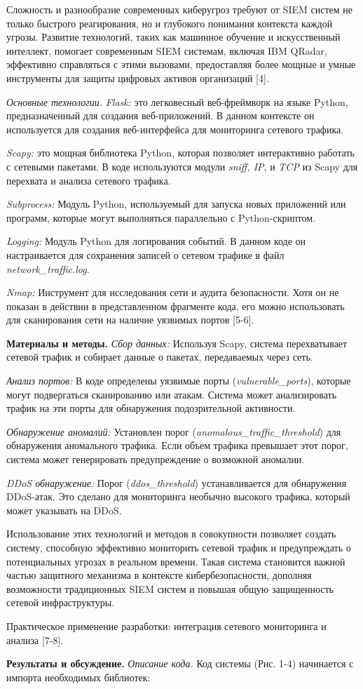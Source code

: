 \begin{multicols}{2}
Сложность и разнообразие современных киберугроз требуют от SIEM систем
не только быстрого реагирования, но и глубокого понимания контекста
каждой угрозы. Развитие технологий, таких как машинное обучение и
искусственный интеллект, помогает современным SIEM системам, включая IBM
QRadar, эффективно справляться с этими вызовами, предоставляя более
мощные и умные инструменты для защиты цифровых активов организаций
{[}4{]}.

\emph{Основные технологии.} \emph{Flask:} это легковесный веб-фреймворк
на языке Python, предназначенный для создания веб-приложений. В данном
контексте он используется для создания веб-интерфейса для мониторинга
сетевого трафика.

\emph{Scapy:} это мощная библиотека Python, которая позволяет
интерактивно работать с сетевыми пакетами. В коде используются модули
\emph{sniff, IP}, и \emph{TCP} из Scapy для перехвата и анализа сетевого
трафика.

\emph{Subprocess:} Модуль Python, используемый для запуска новых
приложений или программ, которые могут выполняться параллельно с
Python-скриптом.

\emph{Logging:} Модуль Python для логирования событий. В данном коде он
настраивается для сохранения записей о сетевом трафике в файл
\emph{network\_traffic.log}.

\emph{Nmap:} Инструмент для исследования сети и аудита безопасности.
Хотя он не показан в действии в представленном фрагменте кода, его можно
использовать для сканирования сети на наличие уязвимых портов {[}5-6{]}.

{\bfseries Материалы и методы.} \emph{Сбор данных:} Используя Scapy,
система перехватывает сетевой трафик и собирает данные о пакетах,
передаваемых через сеть.

\emph{Анализ портов:} В коде определены уязвимые порты
(\emph{vulnerable\_ports}), которые могут подвергаться сканированию или
атакам. Система может анализировать трафик на эти порты для обнаружения
подозрительной активности.

\emph{Обнаружение аномалий:} Установлен порог
(\emph{anomalous\_traffic\_threshold}) для обнаружения аномального
трафика. Если объем трафика превышает этот порог, система может
генерировать предупреждение о возможной аномалии.

\emph{DDoS обнаружение:} Порог (\emph{ddos\_threshold}) устанавливается
для обнаружения DDoS-атак. Это сделано для мониторинга необычно высокого
трафика, который может указывать на DDoS.

Использование этих технологий и методов в совокупности позволяет создать
систему, способную эффективно мониторить сетевой трафик и предупреждать
о потенциальных угрозах в реальном времени. Такая система становится
важной частью защитного механизма в контексте кибербезопасности,
дополняя возможности традиционных SIEM систем и повышая общую
защищенность сетевой инфраструктуры.

Практическое применение разработки: интеграция сетевого мониторинга и
анализа {[}7-8{]}.

{\bfseries Результаты и обсуждение.} \emph{Описание кода.} Код системы
(Рис. 1-4) начинается с импорта необходимых библиотек:
\end{multicols}

